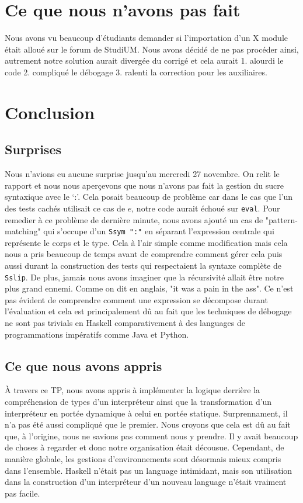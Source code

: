 \documentclass[a4paper,12pt]{article}
\begin{document}
\section{Ce que nous n'avons pas fait}
    Nous avons vu beaucoup d'étudiants demander si l'importation d'un
    X module était alloué sur le forum de StudiUM. Nous avons décidé
    de ne pas procéder ainsi, autrement notre solution aurait divergée
    du corrigé et cela aurait 1. alourdi le code 2. compliqué le 
    débogage 3. ralenti la correction pour les auxiliaires.

\section{Conclusion}
    \subsection{Surprises}
        Nous n'avions eu aucune surprise jusqu'au mercredi 27 novembre. On relit le 
        rapport et nous nous aperçevons que nous n'avons pas fait la gestion du sucre
        syntaxique avec le `:'. Cela posait beaucoup de problème car dans le cas que
        l'un des tests cachés utilisait ce cas de $e$, notre code aurait échoué sur
        \texttt{eval}. Pour remedier à ce problème de dernière minute, nous avons 
        ajouté un cas de "pattern-matching" qui s'occupe d'un \texttt{Ssym ":"} en 
        séparant l'expression centrale qui représente le corps et le type. Cela à
        l'air simple comme modification mais cela nous a pris beaucoup de temps avant
        de comprendre comment gérer cela puis aussi durant la construction des tests 
        qui respectaient la syntaxe complète de \texttt{Sslip}. De plus, jamais nous 
        avons imaginer que la récursivité allait être notre
        plus grand ennemi. Comme on dit en anglais, "it was a pain in the ass". Ce
        n'est pas évident de comprendre comment une expression se décompose durant
        l'évaluation et cela est principalement dû au fait que les techniques de 
        débogage ne sont pas trivials en Haskell comparativement à des languages
        de programmations impératifs comme Java et Python. 
    \subsection{Ce que nous avons appris}
        À travers ce TP, nous avons appris à implémenter la logique derrière 
        la compréhension de types d'un interpréteur ainsi que la transformation
        d'un interpréteur en portée dynamique à celui en portée statique. 
        Surprennament, il n'a pas été aussi compliqué que le premier. Nous croyons
        que cela est dû au fait que, à l'origine, nous ne savions pas comment nous
        y prendre. Il y avait beaucoup de choses à regarder et donc notre 
        organisation était décousue. Cependant, de manière globale, les gestions 
        d'environnements sont désormais mieux compris dans l'ensemble. Haskell 
        n'était pas un language intimidant, mais son utilisation dans la construction
        d'un interpréteur d'un nouveau language n'était vraiment pas facile.
\end{document}
